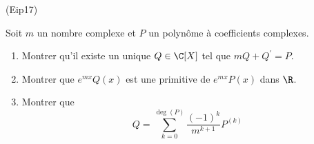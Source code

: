 \begin{tiny}(Eip17)\end{tiny}
Soit $m$ un nombre complexe et $P$ un polyn{\^o}me {\`a} coefficients complexes.

\begin{enumerate}
\item Montrer qu'il existe un unique $Q\in \C[X]$ tel que $mQ+Q^{\prime }=P$.

\item Montrer que $e^{mx}Q(x)$ est une primitive de $e^{mx}P(x)$ dans $\R$.

\item Montrer que
\[
Q=\sum_{k=0}^{\deg (P)}\frac{(-1)^{k}}{m^{k+1}}P^{(k)}
\]
\end{enumerate}